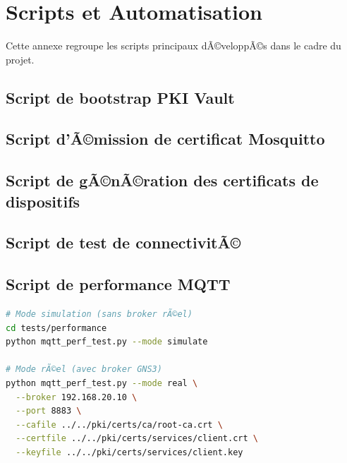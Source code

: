 \chapter{Scripts et Automatisation}
\label{annex:scripts}

Cette annexe regroupe les scripts principaux dÃ©veloppÃ©s dans le cadre du projet.

\section{Script de bootstrap PKI Vault}
\label{sec:script_pki}



\section{Script d'Ã©mission de certificat Mosquitto}



\section{Script de gÃ©nÃ©ration des certificats de dispositifs}



\section{Script de test de connectivitÃ©}



\section{Script de performance MQTT}

\begin{lstlisting}[language=bash, caption=ExÃ©cution du test de performance]
# Mode simulation (sans broker rÃ©el)
cd tests/performance
python mqtt_perf_test.py --mode simulate

# Mode rÃ©el (avec broker GNS3)
python mqtt_perf_test.py --mode real \
  --broker 192.168.20.10 \
  --port 8883 \
  --cafile ../../pki/certs/ca/root-ca.crt \
  --certfile ../../pki/certs/services/client.crt \
  --keyfile ../../pki/certs/services/client.key
\end{lstlisting}
